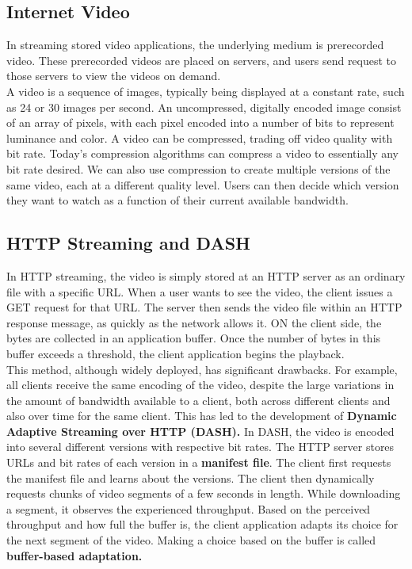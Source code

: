 \subsection{Internet Video}
In streaming stored video applications, the underlying medium is prerecorded video. These prerecorded videos are placed on servers, and users send request to those servers to view the videos on demand. \\
A video is a sequence of images, typically being displayed at a constant rate, such as 24 or 30 images per second. An uncompressed, digitally encoded image consist of an array of pixels, with each pixel encoded into a number of bits to represent luminance and color. A video can be compressed, trading off video quality  with bit rate. Today's compression algorithms can compress a video to essentially any bit rate desired. We can also use compression to create multiple versions of the same video, each at a different quality level. Users can then decide which version they want to watch as a function of their current available bandwidth.

\subsection{HTTP Streaming and DASH}
In HTTP streaming, the video is simply stored at an HTTP server as an ordinary file with a specific URL. When a user wants to see the video, the client issues a GET request for that URL. The server then sends the video file within an HTTP response message, as quickly as the network allows it. ON the client side, the bytes are collected in an application buffer. Once the number of bytes in this buffer exceeds a threshold, the client application begins the playback. \\
This method, although widely deployed, has significant drawbacks. For example, all clients receive the same encoding of the video, despite the large variations in the amount of bandwidth available to a client, both across different clients and also over time for the same client. This has led to the development of \textbf{Dynamic Adaptive Streaming over HTTP (DASH).} In DASH, the video is encoded into several different versions with respective bit rates. The HTTP server stores URLs and bit rates of each version in a \textbf{manifest file}. The client first requests the manifest file and learns about the versions. The client then dynamically requests chunks of video segments of a few seconds in length. While downloading a segment, it observes the experienced throughput. Based on the perceived throughput and how full the buffer is, the client application adapts its choice for the next segment of the video. Making a choice based on the buffer is called \textbf{buffer-based adaptation.}

